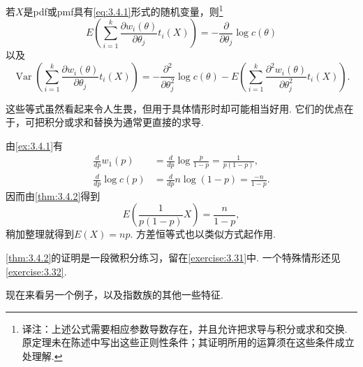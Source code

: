 \begin{theorem}\label{thm:3.4.2}
若$X$是pdf或pmf具有\eqref{eq:3.4.1}形式的随机变量，则\footnote{译注：上述公式需要相应参数导数存在，并且允许把求导与积分或求和交换. 原定理未在陈述中写出这些正则性条件；其证明所用的运算须在这些条件成立处理解.}
\begin{equation}\label{eq:3.4.4}
E\left(\sum_{i=1}^k\frac{\partial w_i(\theta)}{\partial\theta_j}t_i(X)\right)=-\frac\partial{\partial\theta_j}\log c(\theta)
\end{equation}
以及
\begin{equation}\label{eq:3.4.5}
\operatorname{Var}\left(\sum_{i=1}^k\frac{\partial w_i(\theta)}{\partial\theta_j}t_i(X)\right)=-\frac{\partial^2}{\partial\theta_j^2}\log c(\theta)-E\left(\sum_{i=1}^k\frac{\partial^2w_i(\theta)}{\partial\theta_j^2}t_i(X)\right).
\end{equation}
\end{theorem}

这些等式虽然看起来令人生畏，但用于具体情形时却可能相当好用. 它们的优点在于，可把积分或求和替换为通常更直接的求导.

\begin{example}[二项均值和方差]\label{ex:3.4.3}
由\autoref{ex:3.4.1}有
\begin{align*}
\frac d{dp}w_1(p)&=\frac d{dp}\log\frac p{1-p}=\frac1{p(1-p)},\\
\frac d{dp}\log c(p)&=\frac d{dp}n\log(1-p)=\frac{-n}{1-p}.
\end{align*}
因而由\autoref{thm:3.4.2}得到
$$E\left(\frac1{p(1-p)}X\right)=\frac n{1-p},$$
稍加整理就得到$E(X)=np$. 方差恒等式也以类似方式起作用.
\end{example}
\autoref{thm:3.4.2}的证明是一段微积分练习，留在\autoref{exercise:3.31}中. 一个特殊情形还见\autoref{exercise:3.32}.

现在来看另一个例子，以及指数族的其他一些特征.

